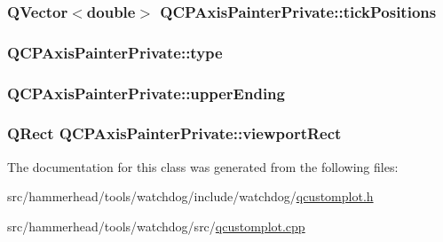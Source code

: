 \subsubsection[{\texorpdfstring{tick\+Positions}{tickPositions}}]{\setlength{\rightskip}{0pt plus 5cm}Q\+Vector$<$double$>$ Q\+C\+P\+Axis\+Painter\+Private\+::tick\+Positions}\hypertarget{classQCPAxisPainterPrivate_ae55e3dc2cf2af8d8a6e7235ccab54786}{}\label{classQCPAxisPainterPrivate_ae55e3dc2cf2af8d8a6e7235ccab54786}
\subsubsection[{\texorpdfstring{type}{type}}]{ Q\+C\+P\+Axis\+Painter\+Private\+::type}\hypertarget{classQCPAxisPainterPrivate_ae04594e97417336933d807c86d353098}{}\label{classQCPAxisPainterPrivate_ae04594e97417336933d807c86d353098}
\subsubsection[{\texorpdfstring{upper\+Ending}{upperEnding}}]{ Q\+C\+P\+Axis\+Painter\+Private\+::upper\+Ending}\hypertarget{classQCPAxisPainterPrivate_af764be913be5f924700ac9bbb8c01139}{}\label{classQCPAxisPainterPrivate_af764be913be5f924700ac9bbb8c01139}
\subsubsection[{\texorpdfstring{viewport\+Rect}{viewportRect}}]{\setlength{\rightskip}{0pt plus 5cm}Q\+Rect Q\+C\+P\+Axis\+Painter\+Private\+::viewport\+Rect}\hypertarget{classQCPAxisPainterPrivate_a8627dc6b40781e3291bb508e4ac574d6}{}\label{classQCPAxisPainterPrivate_a8627dc6b40781e3291bb508e4ac574d6}


The documentation for this class was generated from the following files\+:\begin{DoxyCompactItemize}
\item 
src/hammerhead/tools/watchdog/include/watchdog/\hyperlink{qcustomplot_8h}{qcustomplot.\+h}\item 
src/hammerhead/tools/watchdog/src/\hyperlink{qcustomplot_8cpp}{qcustomplot.\+cpp}\end{DoxyCompactItemize}
